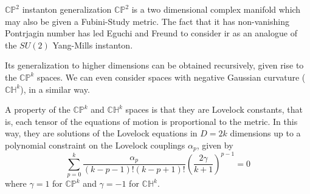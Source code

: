 \documentclass[aspectratio=169,xcolor=dvipsnames]{beamer}
\begin{document}
\begin{frame}{$\mathbb{CP}^2$ instanton generalization}
$\mathbb{CP}^2$ is a two dimensional complex manifold which may also be given a Fubini-Study metric. The fact that it has non-vanishing Pontrjagin number has led Eguchi and Freund to consider ir as an analogue of the $SU(2)$ Yang-Mills instanton.

Its generalization to higher dimensions can be obtained recursively, given rise to the $\mathbb{CP}^k$ spaces. We can even consider spaces with negative Gaussian curvature ($\mathbb{CH}^k$), in a similar way. 

A property of the $\mathbb{CP}^k$ and $\mathbb{CH}^k$ spaces is that they are Lovelock constants, that is, each tensor of the equations of motion is proportional to the metric. In this way, they are solutions of the Lovelock equations in $D=2k$ dimensions up to a polynomial constraint on the Lovelock couplings $\alpha_p$, given by
\begin{equation}
  \sum_{p=0}^k\frac{\alpha_p}{(k-p-1)!(k-p+1)!}\left(\frac{2\gamma}{k+1}\right)^{p-1}=0
\end{equation}
where $\gamma=1$ for $\mathbb{CP}^k$ and $\gamma=-1$ for $\mathbb{CH}^k$.

	
\end{frame}


\end{document}
